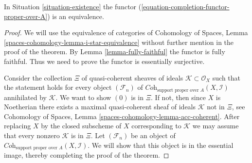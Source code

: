 %
\begin{theorem}
\label{theorem-grothendieck-existence}
In Situation \ref{situation-existence} the functor
(\ref{equation-completion-functor-proper-over-A})
is an equivalence.
\end{theorem}

\begin{proof}
We will use the equivalence of categories of
Cohomology of Spaces, Lemma \ref{spaces-cohomology-lemma-i-star-equivalence}
without further mention in the proof of the theorem.
By Lemma \ref{lemma-fully-faithful} the functor is fully faithful.
Thus we need to prove the functor is essentially surjective.

\medskip\noindent
Consider the collection $\Xi$ of quasi-coherent sheaves of ideals
$\mathcal{K} \subset \mathcal{O}_X$ such that the statement holds
for every object $(\mathcal{F}_n)$ of
$\textit{Coh}_{\text{support proper over }A}(X, \mathcal{I})$
annihilated by $\mathcal{K}$. We want to show $(0)$ is in $\Xi$.
If not, then since $X$ is Noetherian there exists a maximal
quasi-coherent sheaf of ideals $\mathcal{K}$ not in $\Xi$, see
Cohomology of Spaces, Lemma \ref{spaces-cohomology-lemma-acc-coherent}.
After replacing $X$ by the closed subscheme of $X$
corresponding to $\mathcal{K}$ we may assume that every nonzero
$\mathcal{K}$ is in $\Xi$. Let $(\mathcal{F}_n)$ be an object of
$\textit{Coh}_{\text{support proper over }A}(X, \mathcal{I})$.
We will show that this object is in the essential image, thereby
completing the proof of the theorem.


\end{proof}
